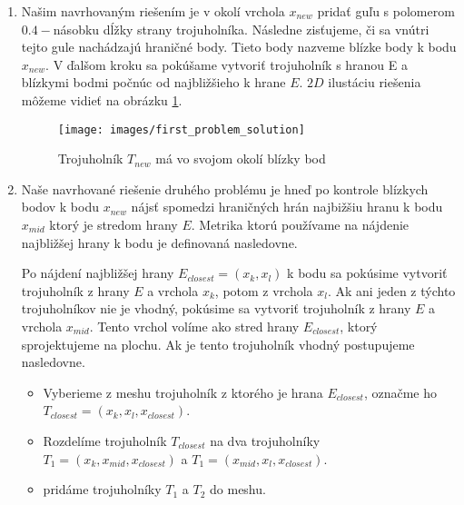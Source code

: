 \begin{enumerate}
\item{
    Našim navrhovaným riešením je v okolí vrchola $x_{new}$ pridať guľu s polomerom 
    $0.4-$násobku dĺžky strany trojuholníka. Následne zisťujeme, či sa vnútri tejto gule nachádzajú 
    hraničné body. Tieto body nazveme blízke body k bodu $x_{new}$. V ďalšom kroku 
    sa pokúšame vytvoriť trojuholník s hranou E a blízkymi bodmi počnúc od najbližšieho k hrane $E$. 
    $2D$ ilustáciu riešenia môžeme vidieť na obrázku \ref{obr:first_problem_solution}. 

    \begin{figure}
        \centerline{\texttt{[image: images/first\_problem\_solution]}}
        \caption[Trojuholník $T_{new}$ má vo svojom okolí blízky bod]{Trojuholník $T_{new}$ má vo svojom okolí blízky bod}
        \label{obr:first_problem_solution}
    \end{figure}
}

\item{

    Naše navrhované riešenie druhého problému je hneď po kontrole blízkych bodov k bodu 
    $x_{new}$ nájsť spomedzi hraničných hrán najbižšiu hranu k bodu $x_{mid}$
    ktorý je stredom hrany $E$. 
    Metrika ktorú používame na nájdenie najbližšej hrany k bodu je definovaná nasledovne.

    Po nájdení najbližšej hrany $E_{closest} = (x_k, x_l)$ 
    k bodu sa pokúsime vytvoriť trojuholník z hrany $E$ a vrchola $x_k$, potom z
    vrchola $x_l$. Ak ani jeden z týchto trojuholníkov nie je vhodný, pokúsime sa 
    vytvoriť trojuholník z hrany $E$ a vrchola $x_{mid}$. Tento vrchol 
    volíme ako stred hrany $E_{closest}$, ktorý sprojektujeme na plochu. Ak je tento trojuholník vhodný
    postupujeme nasledovne. 
    
    \begin{itemize}
    \item{
        Vyberieme z meshu trojuholník z ktorého je hrana $E_{closest}$, označme ho 
        $T_{closest}=(x_k, x_l, x_{closest})$.
    }
    \item{
        Rozdelíme trojuholník $T_{closest}$ na dva trojuholníky $T_1 = (x_k, x_{mid}, x_{closest})$ a
        $T_1 = (x_{mid}, x_l, x_{closest})$.
    }
    \item{
        pridáme trojuholníky $T_1$ a $T_2$ do meshu. 
    }
    \end{itemize}

}
\end{enumerate}
